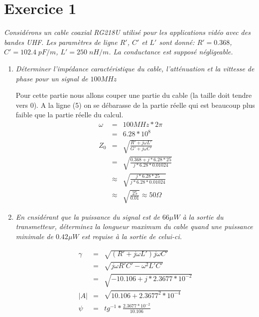 \documentclass[a4paper,11pt,onecolumn]{article}
\begin{document}
\section{Exercice 1}
	\textit{Considérons un cable coaxial RG218\/U utilisé pour les applications vidéo avec des bandes UHF. Les paramètres de ligne $R'$, $C'$ et $L'$ sont donné: $R' = 0.368$, $C'=102.4 \;pF/m$, $L'=250 \;nH/m$. La conductance est supposé négligeable.}
	\begin{enumerate}
		\item \textit{Déterminer l'impédance caractéristique du cable, l'atténuation et la vittesse de phase pour un signal de $100 MHz$}

		\begin{framed}
		Pour cette partie nous allons couper une partie du cable (la taille doit tendre vers 0). A la ligne (5) on se débarasse de la partie réelle qui est beaucoup plus faible que la partie réelle du calcul.
		\begin{eqnarray*}
			\omega &=&100MHz * 2\pi\\
			&=& 6.28*10^8\\
			Z_0 &=& \sqrt{\frac{R'+j\omega L'}{G' + j\omega C'}}\\
			&=& \sqrt{\frac{0.368 + j * 6.28 * 25}{j*6.28 * 0.01024}} \\
			&\approx& \sqrt{\frac{j * 6.28 * 25}{j*6.28 * 0.01024}}\\
			&\approx& \sqrt{\frac{25}{0.01}} \approx 50 \Omega
		\end{eqnarray*}
		\end{framed}
	
		\item \textit{En cnsidérant que la puissance du signal est de $66\mu W$ à la sortie du transmetteur, déterminez la longueur maximum du cable quand une puissance minimale de $0.42\mu W$ est requise à la sortie de celui-ci.}
		\begin{framed}
		\begin{eqnarray*}
			\gamma &=& \sqrt{(R' + j\omega L')j \omega C'} \\
			&=& \sqrt{j\omega R' C' - \omega^2 L' C'} \\
			&=& \sqrt{-10.106 + j*2.3677 * 10^{-2}} \\
			|A| &=& \sqrt{10.106+2.3677^2*10^{-4}} \\
			\psi &=& tg^{-1} * \frac{2.3677*10^{-2}}{10.106}
		\end{eqnarray*}
		\end{framed}
			
	\end{enumerate}
\end{document}
